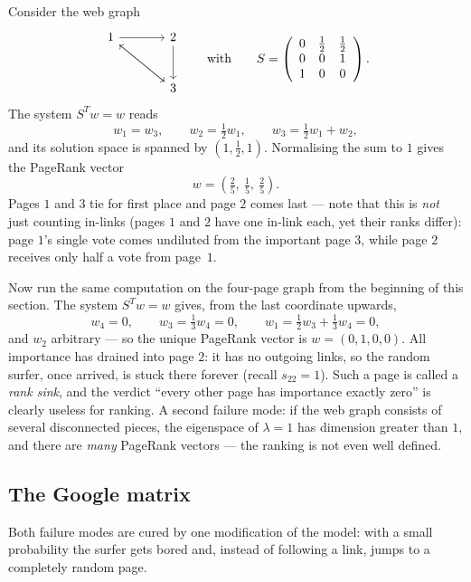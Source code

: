 \begin{example}
Consider the web graph
\[
\begin{tikzcd}[row sep=large, column sep=large]
1 \arrow[r] \arrow[dr] & 2 \arrow[d] \\
& 3 \arrow[ul]
\end{tikzcd}
\qquad\text{with}\qquad
S=\left( \begin{array}{ccc}
0 & \tfrac12 & \tfrac12\\
0 & 0 & 1\\
1 & 0 & 0
\end{array} \right).
\]
The system $S^T w = w$ reads
\[
w_1 = w_3, \qquad w_2 = \tfrac12 w_1, \qquad w_3 = \tfrac12 w_1 + w_2,
\]
and its solution space is spanned by $(1, \tfrac12, 1)$. Normalising the sum to $1$ gives the PageRank
vector
\[
w = \left( \tfrac{2}{5},\ \tfrac{1}{5},\ \tfrac{2}{5} \right).
\]
Pages $1$ and $3$ tie for first place and page $2$ comes last — note that this is \emph{not} just
counting in-links (pages $1$ and $2$ have one in-link each, yet their ranks differ): page $1$'s single
vote comes undiluted from the important page $3$, while page $2$ receives only half a vote from page~$1$.
\end{example}

\begin{example}
Now run the same computation on the four-page graph from the beginning of this section. The system
$S^T w = w$ gives, from the last coordinate upwards,
\[
w_4 = 0, \qquad w_3 = \tfrac13 w_4 = 0, \qquad w_1 = \tfrac12 w_3 + \tfrac13 w_4 = 0,
\]
and $w_2$ arbitrary — so the unique PageRank vector is $w = (0,1,0,0)$. All importance has drained into
page $2$: it has no outgoing links, so the random surfer, once arrived, is stuck there forever (recall
$s_{22} = 1$). Such a page is called a \emph{rank sink}, and the verdict ``every other page has
importance exactly zero'' is clearly useless for ranking. A second failure mode: if the web graph
consists of several disconnected pieces, the eigenspace of $\lambda = 1$ has dimension greater than $1$,
and there are \emph{many} PageRank vectors — the ranking is not even well defined.
\end{example}

\subsection{The Google matrix}

Both failure modes are cured by one modification of the model: with a small probability the surfer gets
bored and, instead of following a link, jumps to a completely random page.

